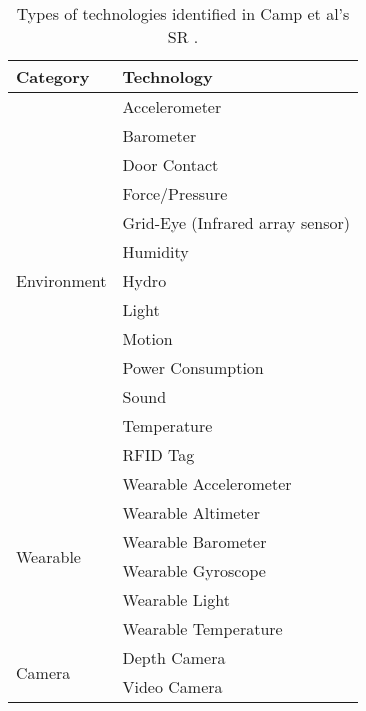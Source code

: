 \begin{table}[!ht]
    \centering
    \caption{Types of technologies identified in Camp et al's SR \cite{camp_technology_2021}.}
    \label{tab:camps-tech}
    \begin{tabular}[pos]{ p{} p{} }
        \toprule
        \textbf{Category} & \textbf{Technology} \\
        \midrule
        \multirow{13}{10em}{Environment} & Accelerometer \\
        & Barometer \\
        & Door Contact \\
        & Force/Pressure \\
        & Grid-Eye (Infrared array sensor) \\
        & Humidity \\
        & Hydro \\
        & Light \\
        & Motion \\
        & Power Consumption \\
        & Sound \\
        & Temperature \\
        & RFID Tag \\
        \midrule
        \multirow{6}{10em}{Wearable} & Wearable Accelerometer \\
        & Wearable Altimeter \\
        & Wearable Barometer \\
        & Wearable Gyroscope \\
        & Wearable Light \\
        & Wearable Temperature \\
        \midrule
        \multirow{2}{10em}{Camera} & Depth Camera \\
        & Video Camera \\
        \bottomrule 
    \end{tabular}
\end{table}

